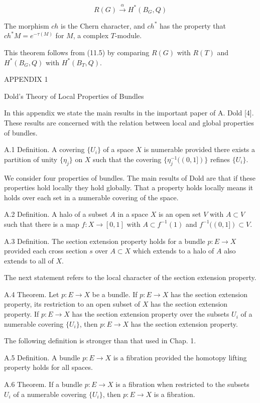 $$
R(G) \xrightarrow{\alpha} H^*(B_G, Q)
$$

The morphism $ch$ is the Chern character, and $ch^*$ has the property that $ch^* M = e^{-\tau(M)}$ for $M$, a complex $T$-module.

This theorem follows from (11.5) by comparing $R(G)$ with $R(T)$ and $H^*(B_G, Q)$ with $H^*(B_T, Q)$.

APPENDIX 1

Dold’s Theory of Local Properties of Bundles

In this appendix we state the main results in the important paper of A. Dold [4]. These results are concerned with the relation between local and global properties of bundles.

A.1 Definition. A covering $\{U_i\}$ of a space $X$ is numerable provided there exists a partition of unity $\{\eta_j\}$ on $X$ such that the covering $\{\eta_j^{-1}((0,1])\}$ refines $\{U_i\}$.

We consider four properties of bundles. The main results of Dold are that if these properties hold locally they hold globally. That a property holds locally means it holds over each set in a numerable covering of the space.

A.2 Definition. A halo of a subset $A$ in a space $X$ is an open set $V$ with $A \subset V$ such that there is a map $f: X \rightarrow [0,1]$ with $A \subset f^{-1}(1)$ and $f^{-1}((0,1]) \subset V$.

A.3 Definition. The section extension property holds for a bundle $p: E \rightarrow X$ provided each cross section $s$ over $A \subset X$ which extends to a halo of $A$ also extends to all of $X$.

The next statement refers to the local character of the section extension property.

A.4 Theorem. Let $p: E \rightarrow X$ be a bundle. If $p: E \rightarrow X$ has the section extension property, its restriction to an open subset of $X$ has the section extension property. If $p: E \rightarrow X$ has the section extension property over the subsets $U_i$ of a numerable covering $\{U_i\}$, then $p: E \rightarrow X$ has the section extension property.

The following definition is stronger than that used in Chap. 1.

A.5 Definition. A bundle $p: E \rightarrow X$ is a fibration provided the homotopy lifting property holds for all spaces.

A.6 Theorem. If a bundle $p: E \rightarrow X$ is a fibration when restricted to the subsets $U_i$ of a numerable covering $\{U_i\}$, then $p: E \rightarrow X$ is a fibration.

